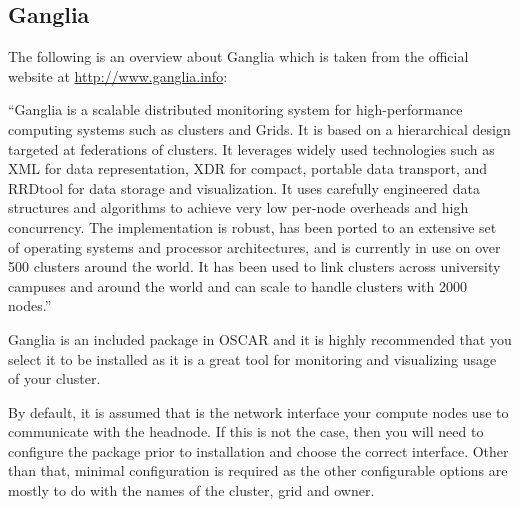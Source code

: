 %
%

\subsection{Ganglia}
\label{app:ganglia}

The following is an overview about Ganglia which is taken from
the official website at \url{http://www.ganglia.info}:

``Ganglia is a scalable distributed monitoring system for high-performance
computing systems such as clusters and Grids.  It is based on a
hierarchical design targeted at federations of clusters.  It
leverages widely used technologies such as XML for data representation,
XDR for compact, portable data transport, and RRDtool for data storage
and visualization.  It uses carefully engineered data structures and
algorithms to achieve very low per-node overheads and high concurrency.
The implementation is robust, has been ported to an extensive set of
operating systems and processor architectures, and is currently in use
on over 500 clusters around the world.  It has been used to link
clusters across university campuses and around the world and can scale
to handle clusters with 2000 nodes.''

Ganglia is an included package in OSCAR and it is highly recommended
that you select it to be installed as it is a great tool for monitoring
and visualizing usage of your cluster.

By default, it is assumed that  is the network interface your
compute nodes use to communicate with the headnode.  If this is not
the case, then you will need to configure the package prior to
installation and choose the correct interface.  Other than that,
minimal configuration is required as the other configurable options
are mostly to do with the names of the cluster, grid and owner.
